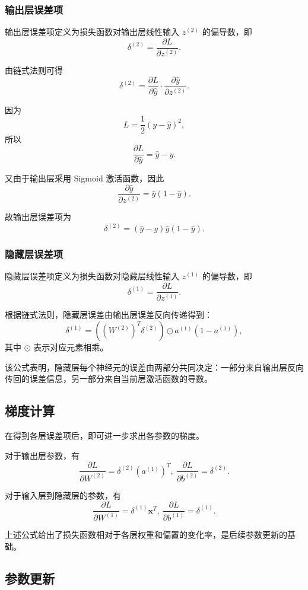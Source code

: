 \documentclass[12pt,a4paper]{ctexart}
\begin{document}
	\subsubsection{输出层误差项}
	
	输出层误差项定义为损失函数对输出层线性输入 $z^{(2)}$ 的偏导数，即
	\[
	\delta^{(2)} = \frac{\partial L}{\partial z^{(2)}}.
	\]
	
	由链式法则可得
	\[
	\delta^{(2)} =
	\frac{\partial L}{\partial \hat{y}}
	\cdot
	\frac{\partial \hat{y}}{\partial z^{(2)}}.
	\]
	
	因为
	\[
	L = \frac{1}{2}(y-\hat{y})^2,
	\]
	所以
	\[
	\frac{\partial L}{\partial \hat{y}} = \hat{y}-y.
	\]
	
	又由于输出层采用 Sigmoid 激活函数，因此
	\[
	\frac{\partial \hat{y}}{\partial z^{(2)}} = \hat{y}(1-\hat{y}).
	\]
	
	故输出层误差项为
	\[
	\delta^{(2)} = (\hat{y}-y)\hat{y}(1-\hat{y}).
	\]
	
	\subsubsection{隐藏层误差项}
	
	隐藏层误差项定义为损失函数对隐藏层线性输入 $z^{(1)}$ 的偏导数，即
	\[
	\delta^{(1)} = \frac{\partial L}{\partial z^{(1)}}.
	\]
	
	根据链式法则，隐藏层误差由输出层误差反向传递得到：
	\[
	\delta^{(1)} =
	\left((W^{(2)})^T \delta^{(2)}\right)\odot a^{(1)}(1-a^{(1)}),
	\]
	其中 $\odot$ 表示对应元素相乘。
	
	该公式表明，隐藏层每个神经元的误差由两部分共同决定：一部分来自输出层反向传回的误差信息，另一部分来自当前层激活函数的导数。
	
	\subsection{梯度计算}
	
	在得到各层误差项后，即可进一步求出各参数的梯度。
	
	对于输出层参数，有
	\[
	\frac{\partial L}{\partial W^{(2)}} = \delta^{(2)}(a^{(1)})^T,\ \frac{\partial L}{\partial b^{(2)}} = \delta^{(2)}.
	\]
	
	对于输入层到隐藏层的参数，有
	\[
	\frac{\partial L}{\partial W^{(1)}} = \delta^{(1)}\mathbf{x}^T,\ \frac{\partial L}{\partial b^{(1)}} = \delta^{(1)}.
	\]
	
	上述公式给出了损失函数相对于各层权重和偏置的变化率，是后续参数更新的基础。
	
	\subsection{参数更新}
	
\end{document}
